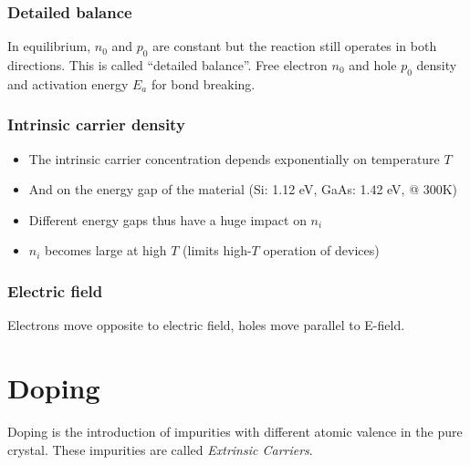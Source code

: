 \documentclass[a4paper, fontsize=8pt, landscape, DIV=1]{scrartcl}
\begin{document}
\begin{multicols*}{4}
  \subsubsection{Detailed balance}
  In equilibrium, $n_0$ and $p_0$ are constant but the reaction still operates in both directions. This is called ``detailed balance''.
  Free electron $n_0$ and hole $p_0$ density and activation energy $E_a$ for bond breaking.

  \subsubsection{Intrinsic carrier density}
  \begin{itemize}
    \item The intrinsic carrier concentration depends exponentially on temperature $T$
    \item And on the energy gap of the material (Si: 1.12 eV, GaAs: 1.42 eV, @ 300K)
    \item Different energy gaps thus have a huge impact on $n_i$
    \item $n_i$ becomes large at high $T$ (limits high-$T$ operation of devices)
  \end{itemize}

  \subsubsection{Electric field}
  Electrons move opposite to electric field, holes move parallel to E-field.

  \section{Doping}
  Doping is the introduction of impurities with different atomic valence in the pure crystal. These impurities are called \textit{Extrinsic Carriers}.



\end{multicols*}
\end{document}

